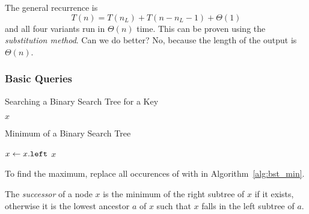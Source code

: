 The general recurrence is 
\[
T(n) = T(n_L) + T(n - n_L - 1) + \Theta(1)
\]
and all four variants run in \(\Theta(n)\) time. 
This can be proven using the \emph{substitution method}.
Can we do better? No, because the length of the output is \(\Theta(n)\).

\subsubsection{Basic Queries}

\begin{algorithm}[htb]
  \caption{Searching a Binary Search Tree for a Key}
  \label{alg:bst_search}
  \begin{algorithmic}[1]
        \State \Return $x$ 
      \EndIf
        \State \Return {}
      \Else
        \State \Return {}
      \EndIf
    \EndFunction
  \end{algorithmic}
\end{algorithm}


\begin{algorithm}[htb]
  \caption{Minimum of a Binary Search Tree}
  \label{alg:bst_min}
  \begin{algorithmic}[1]
      \State $x\gets x\mathtt{.}\mathtt{left}$ 
      \EndWhile
      \State \Return $x$
    \EndFunction
  \end{algorithmic}
\end{algorithm}
To find the maximum, replace all occurences of  with  in Algorithm~\ref{alg:bst_min}.

\begin{definition}[Successor]
  The \emph{successor} of a node \(x\) is the minimum of the right subtree of \(x\) if it exists, otherwise it is the lowest ancestor \(a\) of \(x\) such that \(x\) falls in the left subtree of \(a\).
\end{definition}


